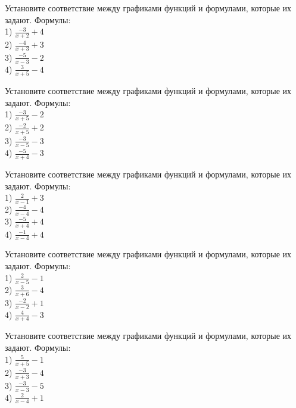 \documentclass[4apaper]{article}
\begin{document}
\begin{taskBN}{46}
Установите соответствие между графиками функций и формулами, которые их задают. Формулы: \\1) $\frac{-3}{x+2}+4$\\2) $\frac{-4}{x+3}+3$\\3) $\frac{-5}{x-3}-2$\\4) $\frac{3}{x+5}-4$
\end{taskBN}

\begin{taskBN}{47}
Установите соответствие между графиками функций и формулами, которые их задают. Формулы: \\1) $\frac{-3}{x+5}-2$\\2) $\frac{-2}{x+5}+2$\\3) $\frac{-3}{x-5}-3$\\4) $\frac{-5}{x+4}-3$
\end{taskBN}

\begin{taskBN}{48}
Установите соответствие между графиками функций и формулами, которые их задают. Формулы: \\1) $\frac{2}{x-1}+3$\\2) $\frac{-4}{x-4}-4$\\3) $\frac{-5}{x+4}+4$\\4) $\frac{-1}{x-4}+4$
\end{taskBN}

\begin{taskBN}{49}
Установите соответствие между графиками функций и формулами, которые их задают. Формулы: \\1) $\frac{2}{x-5}-1$\\2) $\frac{3}{x+6}-4$\\3) $\frac{-2}{x-2}+1$\\4) $\frac{4}{x+4}-3$
\end{taskBN}

\begin{taskBN}{50}
Установите соответствие между графиками функций и формулами, которые их задают. Формулы: \\1) $\frac{5}{x+5}-1$\\2) $\frac{-3}{x+3}-4$\\3) $\frac{-3}{x-3}-5$\\4) $\frac{2}{x-4}+1$
\end{taskBN}
\end{document}
